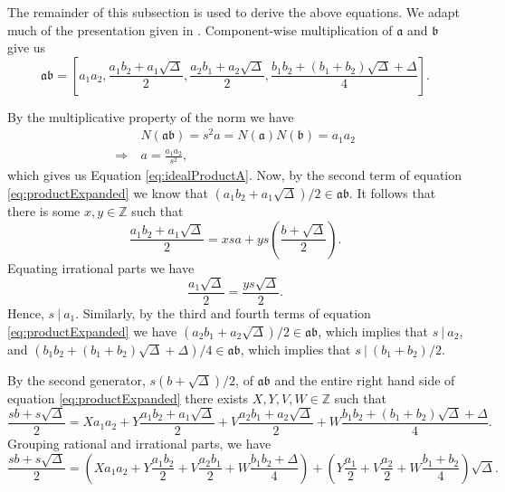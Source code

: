 \documentclass{ucalgthes1}
\theoremstyle{definition}
\newcommand{\ZZ}{\mathbb{Z}}
\begin{document}
The remainder of this subsection is used to derive the above equations.  We adapt much of the presentation given in \cite[pp.117,118]{Jacobson2009}. Component-wise multiplication of $\mathfrak a$ and $\mathfrak b$ give us
\begin{equation}
\label{eq:productExpanded}
\mathfrak{a} \mathfrak{b} =
\left[ a_1a_2, \frac{a_1b_2 + a_1\sqrt{\Delta}}{2}, \frac{a_2b_1 + a_2\sqrt{\Delta}}{2}, \frac{b_1b_2 + (b_1+b_2)\sqrt{\Delta} + \Delta}{4} \right].
\end{equation}

\noindent
By the multiplicative property of the norm we have
\begin{align*}
	& N(\mathfrak{a}\mathfrak{b}) = s^2a = N(\mathfrak{a})N(\mathfrak{b}) = a_1 a_2 \\
	\Rightarrow~ & a = \frac{a_1a_2}{s^2},
\end{align*}
which gives us Equation \ref{eq:idealProductA}. Now, by the second term of equation \eqref{eq:productExpanded} we know that $(a_1b_2 + a_1\sqrt{\Delta})/2 \in \mathfrak{a}\mathfrak{b}$.  It follows that there is some $x,y \in \ZZ$ such that
\[
	\frac{a_1b_2 + a_1\sqrt{\Delta}}{2} = xsa + ys\left(\frac{b+\sqrt{\Delta}}{2}\right).
\]
Equating irrational parts we have
\begin{equation*}
	\frac{a_1\sqrt{\Delta}}{2} = \frac{ys\sqrt{\Delta}}{2}.
\end{equation*}
\noindent
Hence, $s ~|~ a_1$.  Similarly, by the third and fourth terms of equation \eqref{eq:productExpanded} we have $(a_2b_1+a_2\sqrt{\Delta})/2 \in \mathfrak{a}\mathfrak{b}$, which implies that $s~|~a_2$, and $(b_1b_2 + (b_1+b_2)\sqrt{\Delta} + \Delta)/4 \in \mathfrak{a}\mathfrak{b}$, which implies that $s~|~(b_1+b_2)/2$. 

By the second generator, $s(b+\sqrt\Delta)/2$, of $\mathfrak{a}\mathfrak{b}$ and the entire right hand side of equation \eqref{eq:productExpanded} there exists $X, Y, V, W \in \ZZ$ such that
\[
\frac{sb+s\sqrt\Delta}{2} = Xa_1a_2 + Y\frac{a_1b_2+a_1\sqrt\Delta}{2} + V\frac{a_2b_1 + a_2\sqrt{\Delta}}{2} + W\frac{b_1b_2 + (b_1+b_2)\sqrt{\Delta} + \Delta}{4}.
\]
Grouping rational and irrational parts, we have
\begin{equation}
\label{eq:productSecond}
\frac{sb+s\sqrt\Delta}{2} = \left( Xa_1a_2 + Y\frac{a_1b_2}{2} + V\frac{a_2b_1}{2} + W\frac{b_1b_2 + \Delta}{4} \right) + \left(Y\frac{a_1}{2} + V\frac{a_2}{2} + W\frac{b_1+b_2}{4}\right)\sqrt\Delta. 
\end{equation}
\end{document}
